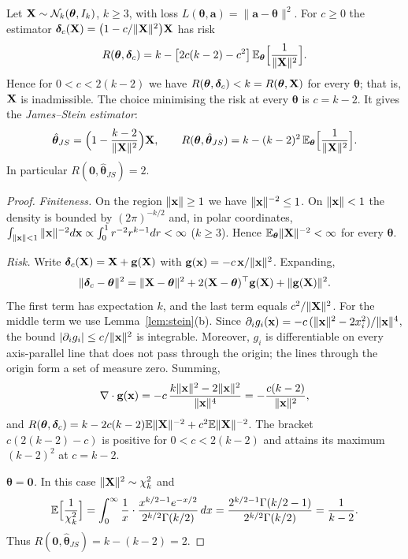 \documentclass[main.tex]{subfiles}
\begin{document}
\begin{theorem}\label{thm:james-stein}
Let $\mathbf{X}\sim\mathcal{N}_k(\bm\theta,I_k)$, $k\ge3$, with loss $L(\bm\theta,\mathbf a)=\|\mathbf a-\bm\theta\|^2$. For $c\ge0$ the estimator $\bm\delta_c(\mathbf{X})=\big(1-c/\|\mathbf{X}\|^2\big)\mathbf{X}$ has risk
\[
R(\bm\theta,\bm\delta_c)=k-\big[2c(k-2)-c^2\big]\,\mathbb{E}_{\bm\theta}\Big[\frac1{\|\mathbf{X}\|^2}\Big].
\]
Hence for $0<c<2(k-2)$ we have $R(\bm\theta,\bm\delta_c)<k=R(\bm\theta,\mathbf{X})$ for every $\bm\theta$; that is, $\mathbf{X}$ is inadmissible. The choice minimising the risk at every $\bm\theta$ is $c=k-2$. It gives the \emph{James--Stein estimator}:
\[
\hat{\bm\theta}_{JS}=\Big(1-\frac{k-2}{\|\mathbf{X}\|^2}\Big)\mathbf{X},\qquad R(\bm\theta,\hat{\bm\theta}_{JS})=k-(k-2)^2\,\mathbb{E}_{\bm\theta}\Big[\frac1{\|\mathbf{X}\|^2}\Big].
\]
In particular $R(\mathbf 0,\hat{\bm\theta}_{JS})=2$.
\end{theorem}
\begin{proof}
\emph{Finiteness.} On the region $\|\mathbf{x}\|\ge1$ we have $\|\mathbf{x}\|^{-2}\le1$. On $\|\mathbf{x}\|<1$ the density is bounded by $(2\pi)^{-k/2}$ and, in polar coordinates, $\int_{\|\mathbf{x}\|<1}\|\mathbf{x}\|^{-2}d\mathbf{x}\propto\int_0^1r^{-2}r^{k-1}dr<\infty$ ($k\ge3$). Hence $\mathbb{E}_{\bm\theta}\|\mathbf{X}\|^{-2}<\infty$ for every $\bm\theta$.

\emph{Risk.} Write $\bm\delta_c(\mathbf{X})=\mathbf{X}+\mathbf g(\mathbf{X})$ with $\mathbf g(\mathbf{x})=-c\,\mathbf{x}/\|\mathbf{x}\|^2$. Expanding,
\[
\|\bm\delta_c-\bm\theta\|^2=\|\mathbf{X}-\bm\theta\|^2+2(\mathbf{X}-\bm\theta)^\top\mathbf g(\mathbf{X})+\|\mathbf g(\mathbf{X})\|^2 .
\]
The first term has expectation $k$, and the last term equals $c^2/\|\mathbf{X}\|^2$. For the middle term we use Lemma~\ref{lem:stein}(b). Since $\partial_ig_i(\mathbf{x})=-c\,(\|\mathbf{x}\|^2-2x_i^2)/\|\mathbf{x}\|^4$, the bound $|\partial_ig_i|\le c/\|\mathbf{x}\|^2$ is integrable. Moreover, $g_i$ is differentiable on every axis-parallel line that does not pass through the origin; the lines through the origin form a set of measure zero. Summing,
\[
\nabla\cdot\mathbf g(\mathbf{x})=-c\,\frac{k\|\mathbf{x}\|^2-2\|\mathbf{x}\|^2}{\|\mathbf{x}\|^4}=-\frac{c(k-2)}{\|\mathbf{x}\|^2},
\]
and $R(\bm\theta,\bm\delta_c)=k-2c(k-2)\mathbb{E}\|\mathbf{X}\|^{-2}+c^2\mathbb{E}\|\mathbf{X}\|^{-2}$. The bracket $c(2(k-2)-c)$ is positive for $0<c<2(k-2)$ and attains its maximum $(k-2)^2$ at $c=k-2$.

\emph{$\bm\theta=\mathbf 0$.} In this case $\|\mathbf{X}\|^2\sim\chi^2_k$ and
\[
\mathbb{E}\Big[\frac1{\chi^2_k}\Big]=\int_0^\infty\frac1x\cdot\frac{x^{k/2-1}e^{-x/2}}{2^{k/2}\Gamma(k/2)}\,dx=\frac{2^{k/2-1}\Gamma(k/2-1)}{2^{k/2}\Gamma(k/2)}=\frac1{k-2}.
\]
Thus $R(\mathbf 0,\hat{\bm\theta}_{JS})=k-(k-2)=2$.
\end{proof}
\end{document}

